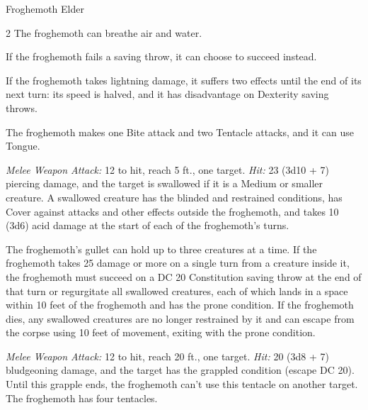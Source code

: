 \documentclass[10pt,a4paper,twoside,bg=print,twocolumn,openany,nodeprecatedcode]{dndbook}
\begin{document}
\begin{DndMonster}[float*=b,width=\textwidth + 8pt]{Froghemoth Elder}
\begin{multicols}{2}
\DndMonsterBasics[
armor-class = {14 (natural armor)},
hit-points = {\DndDice{18d12 + 90}},
speed = {30 ft., swim 30 ft.}
]
\DndMonsterAbilityScores[
 str = 25,
 dex = 13,
 con = 20,
 int = 2,
 wis = 14,
 cha = 8
]
\DndMonsterDetails[
saving-throws = {Str +12, Con +10, Wis +7},
skills = {Perception +12, Stealth +6},
damage-resistances = {fire, lightning},
senses = {darkvision 60 ft., passive perception 22},
challenge = 15,
]
The froghemoth can breathe air and water.

If the froghemoth fails a saving throw, it can choose to succeed instead.

If the froghemoth takes lightning damage, it suffers two effects until the end of its next turn: its speed is halved, and it has disadvantage on Dexterity saving throws.

The froghemoth makes one Bite attack and two Tentacle attacks, and it can use Tongue.

\textsl{Melee Weapon Attack:} 12 to hit, reach 5 ft., one target. \textsl{Hit:} 23 (3d10 + 7) piercing damage, and the target is swallowed if it is a Medium or smaller creature. A swallowed creature has the blinded and restrained conditions, has Cover against attacks and other effects outside the froghemoth, and takes 10 (3d6) acid damage at the start of each of the froghemoth's turns.

The froghemoth's gullet can hold up to three creatures at a time. If the froghemoth takes 25 damage or more on a single turn from a creature inside it, the froghemoth must succeed on a DC 20 Constitution saving throw at the end of that turn or regurgitate all swallowed creatures, each of which lands in a space within 10 feet of the froghemoth and has the prone condition. If the froghemoth dies, any swallowed creatures are no longer restrained by it and can escape from the corpse using 10 feet of movement, exiting with the prone condition.

\textsl{Melee Weapon Attack:} 12 to hit, reach 20 ft., one target. \textsl{Hit:} 20 (3d8 + 7) bludgeoning damage, and the target has the grappled condition (escape DC 20). Until this grapple ends, the froghemoth can't use this tentacle on another target. The froghemoth has four tentacles.


\end{multicols}
\end{DndMonster}
\end{document}
